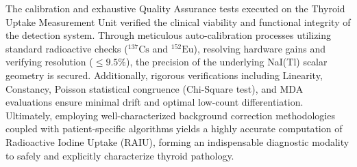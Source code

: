 The calibration and exhaustive Quality Assurance tests executed on the Thyroid Uptake Measurement Unit verified the clinical viability and functional integrity of the detection system. Through meticulous auto-calibration processes utilizing standard radioactive checks ($^{137}\text{Cs}$ and $^{152}\text{Eu}$), resolving hardware gains and verifying resolution ($\leq 9.5\%$), the precision of the underlying NaI(Tl) scalar geometry is secured. Additionally, rigorous verifications including Linearity, Constancy, Poisson statistical congruence (Chi-Square test), and MDA evaluations ensure minimal drift and optimal low-count differentiation. Ultimately, employing well-characterized background correction methodologies coupled with patient-specific algorithms yields a highly accurate computation of Radioactive Iodine Uptake (RAIU), forming an indispensable diagnostic modality to safely and explicitly characterize thyroid pathology.
